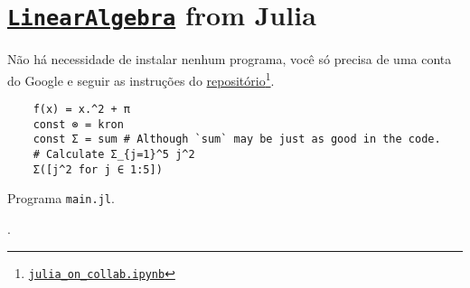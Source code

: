 \chapter{\href{https://docs.julialang.org/en/v1/stdlib/LinearAlgebra}{\texttt{LinearAlgebra}} from Julia}

Não há necessidade de instalar nenhum programa, você só precisa de
uma conta do Google e seguir as instruções do \href{https://github.com/Dsantra92/Julia-on-Colab}{repositório}\footnote{\href{https://colab.research.google.com/github/Dsantra92/Julia-on-Colab/blob/master/julia\_on\_collab.ipynb}{\texttt{julia\_on\_collab.ipynb}}}.

\begin{listing}[H]
  \footnotesize
  \begin{verbatim}
    f(x) = x.^2 + π
    const ⊗ = kron
    const Σ = sum # Although `sum` may be just as good in the code.
    # Calculate Σ_{j=1}^5 j^2
    Σ([j^2 for j ∈ 1:5])
    \end{verbatim}
  \caption{Programa \texttt{main.jl}.}
  \label{lst:3.1}
\end{listing}

.